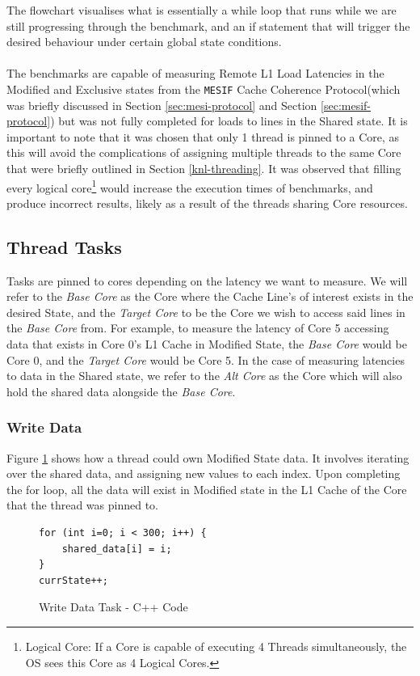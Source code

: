 \documentclass[bsc,frontabs,twoside,singlespacing,parskip,deptreport]{infthesis}     %
\begin{document}
The flowchart visualises what is essentially a while loop that runs while we are still progressing through the benchmark, and an if statement that will trigger the desired behaviour under certain global state conditions. \\
\\
The benchmarks are capable of measuring Remote L1 Load Latencies in the Modified and Exclusive states from the \texttt{MESIF} Cache Coherence Protocol(which was briefly discussed in Section \ref{sec:mesi-protocol} and Section \ref{sec:mesif-protocol}) but was not fully completed for loads to lines in the Shared state. It is  important to note that it was chosen that only 1 thread is pinned to a Core, as this will avoid the complications of assigning multiple threads to the same Core that were briefly outlined in Section \ref{knl-threading}. It was observed that filling every logical core\footnote{Logical Core: If a Core is capable of executing 4 Threads simultaneously, the OS sees this Core as 4 Logical Cores.} would increase the execution times of benchmarks, and produce incorrect results, likely as a result of the threads sharing Core resources.

\subsection{Thread Tasks}
Tasks are pinned to cores depending on the latency we want to measure. We will refer to the \emph{Base Core} as the Core where the Cache Line's of interest exists in the desired State, and the \emph{Target Core} to be the Core we wish to access said lines in the \emph{Base Core} from. For example, to measure the latency of Core 5 accessing data that exists in Core 0's L1 Cache in Modified State, the \emph{Base Core} would be Core 0, and the \emph{Target Core} would be Core 5. In the case of measuring latencies to data in the Shared state, we refer to the \emph{Alt Core} as the Core which will also hold the shared data alongside the \emph{Base Core}.

\subsubsection{Write Data}
Figure \ref{fig:write-data-task-code} shows how a thread could own Modified State data. It involves iterating over the shared data, and assigning new values to each index. Upon completing the for loop, all the data will exist in Modified state in the L1 Cache of the Core that the thread was pinned to.
\begin{figure}[!h]
    \centering
    \begin{minipage}{0.7\textwidth}
    \begin{verbatim}
for (int i=0; i < 300; i++) {
    shared_data[i] = i;
}
currState++;
    \end{verbatim}
    \end{minipage}
    \caption{Write Data Task - C++ Code}
    \label{fig:write-data-task-code}
\end{figure}
\end{document}
